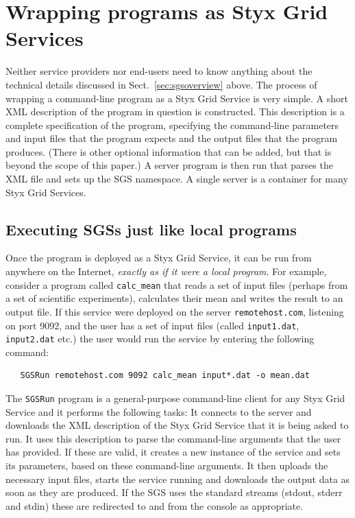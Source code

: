 \documentclass{llncs}
\begin{document}
\section{Wrapping programs as Styx Grid Services}\label{sec:wrapping}
Neither service providers nor end-users need to know anything about the technical details discussed in Sect.~\ref{sec:sgsoverview} above.  The process of wrapping a command-line program as a Styx Grid Service is very simple.  A short XML description of the program in question is constructed.  This description is a complete specification of the program, specifying the command-line parameters and input files that the program expects and the output files that the program produces.  (There is other optional information that can be added, but that is beyond the scope of this paper.)  A server program is then run that parses the XML file and sets up the SGS namespace.  A single server is a container for many Styx Grid Services.

\subsection{Executing SGSs just like local programs}

Once the program is deployed as a Styx Grid Service, it can be run from anywhere on the Internet, {\em exactly as if it were a local program\/}.  For example, consider a program called {\tt calc\_mean} that reads a set of input files (perhaps from a set of scientific experiments), calculates their mean and writes the result to an output file.  If this service were deployed on the server {\tt remotehost.com}, listening on port 9092, and the user has a set of input files (called {\tt input1.dat}, {\tt input2.dat} etc.) the user would run the service by entering the following command:

\begin{verbatim}
   SGSRun remotehost.com 9092 calc_mean input*.dat -o mean.dat
\end{verbatim}

The {\tt SGSRun} program is a general-purpose command-line client for any Styx Grid Service and it performs the following tasks:  It connects to the server and downloads the XML description of the Styx Grid Service that it is being asked to run.  It uses this description to parse the command-line arguments that the user has provided.  If these are valid, it creates a new instance of the service and sets its parameters, based on these command-line arguments.  It then uploads the necessary input files, starts the service running and downloads the output data as soon as they are produced.  If the SGS uses the standard streams (stdout, stderr and stdin) these are redirected to and from the console as appropriate.
\end{document}
